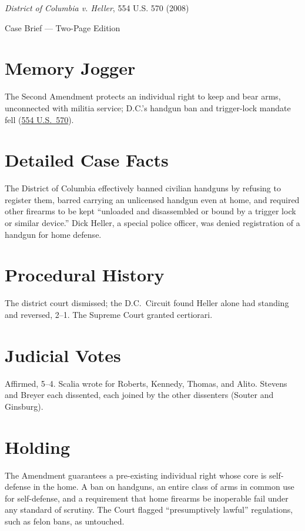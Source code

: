\documentclass[12pt]{article}
\begin{document}
\begin{center}
{\LARGE \textit{District of Columbia v. Heller}, 554 U.S. 570 (2008)\par}
\vspace{0.5em}
{\large Case Brief --- Two-Page Edition\par}
\end{center}

\section{Memory Jogger}
The Second Amendment protects an individual right to keep and bear arms, unconnected with militia service; D.C.'s handgun ban and trigger-lock mandate fell (\href{https://supreme.justia.com/cases/federal/us/554/570/}{554 U.S.\ 570}).

\section{Detailed Case Facts}
The District of Columbia effectively banned civilian handguns by refusing to register them, barred carrying an unlicensed handgun even at home, and required other firearms to be kept ``unloaded and disassembled or bound by a trigger lock or similar device.'' Dick Heller, a special police officer, was denied registration of a handgun for home defense.

\section{Procedural History}
The district court dismissed; the D.C.\ Circuit found Heller alone had standing and reversed, 2--1. The Supreme Court granted certiorari.

\section{Judicial Votes}
Affirmed, 5--4. Scalia wrote for Roberts, Kennedy, Thomas, and Alito. Stevens and Breyer each dissented, each joined by the other dissenters (Souter and Ginsburg).

\section{Holding}
The Amendment guarantees a pre-existing individual right whose core is self-defense in the home. A ban on handguns, an entire class of arms in common use for self-defense, and a requirement that home firearms be inoperable fail under any standard of scrutiny. The Court flagged ``presumptively lawful'' regulations, such as felon bans, as untouched.
\end{document}
